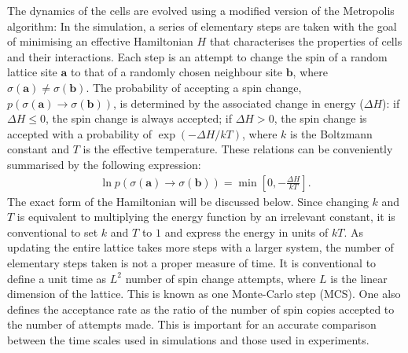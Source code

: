 \documentclass[a4paper,12pt]{article}
\newcommand{\inc}{\Delta}
\begin{document}
The dynamics of the cells are evolved using a modified version of the Metropolis algorithm: In the simulation, a series of elementary steps are taken with the goal of minimising an effective Hamiltonian $H$ that characterises the properties of cells and their interactions. Each step is an attempt to change the spin of a random lattice site $\bm{a}$ to that of a randomly chosen neighbour site $\bm{b}$, where $\sigma(\bm{a}) \neq \sigma(\bm{b})$. The probability of accepting a spin change, $p\left(\sigma(\bm{a}) \rightarrow \sigma(\bm{b})\right)$, is determined by the associated change in energy ($\inc H$): if $\inc H \leq 0$, the spin change is always accepted; if $\inc H > 0$, the spin change is accepted with a probability of $\exp(-\inc H / kT)$, where $k$ is the Boltzmann constant and $T$ is the effective temperature. These relations can be conveniently summarised by the following expression:
\begin{eqnarray}
\ln p\left(\sigma(\bm{a}) \rightarrow \sigma(\bm{b})\right) = \min\left[0,-\frac{\inc H}{kT}\right].
\end{eqnarray}
The exact form of the Hamiltonian will be discussed below. Since changing $k$ and $T$ is equivalent to multiplying the energy function by an irrelevant constant, it is conventional to set $k$ and $T$ to $1$ and express the energy in units of $kT$. As updating the entire lattice takes more steps with a larger system, the number of elementary steps taken is not a proper measure of time. It is conventional to define a unit time as $L^2$ number of spin change attempts, where $L$ is the linear dimension of the lattice. This is known as one Monte-Carlo step (MCS). One also defines the acceptance rate as the ratio of the number of spin copies accepted to the number of attempts made. This is important for an accurate comparison between the time scales used in simulations and those used in experiments\cite{sanz2010}.
\end{document}
